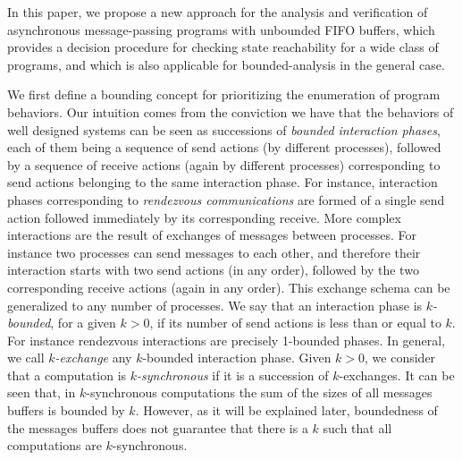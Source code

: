 In this paper, we propose a new approach for the analysis and verification of asynchronous message-passing programs with unbounded FIFO buffers, which provides a decision procedure for checking state reachability for a wide class of programs, and which is also applicable for bounded-analysis in the general case. 

We first define a bounding concept for prioritizing the enumeration of program behaviors. %
Our %
intuition comes from the conviction we have that the behaviors of well designed systems can be seen as successions of {\em bounded interaction phases}, each of them being a sequence of send actions (by different processes), followed by a sequence of receive actions (again by different processes) corresponding to send actions belonging to the same interaction phase. For instance, interaction phases corresponding to {\em rendezvous communications} are formed of a single send action followed immediately by its corresponding receive. More complex interactions are the result of exchanges of messages between processes. For instance two processes can send messages to each other, and therefore their interaction starts with two send actions (in any order), followed by the two corresponding receive actions (again in any order). This exchange schema can 
be generalized to any number of processes. 
We say that an interaction phase is {\em $k$-bounded}, for a given $k > 0$, if its number of send actions is less than or equal to $k$. For instance rendezvous interactions are precisely 1-bounded phases.  In general, we call {\em $k$-exchange} any $k$-bounded interaction phase. 
%
Given $k > 0$, we consider that a computation is {\em $k$-synchronous} if it is a succession of $k$-exchanges.
It can be seen that, in $k$-synchronous computations the sum of the sizes of all messages buffers is bounded by $k$. However, as it will be explained later, boundedness of the messages buffers does not guarantee that there is a $k$ such that all computations are $k$-synchronous. 

